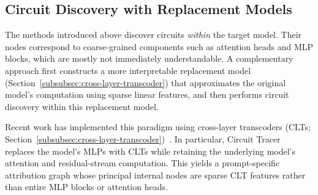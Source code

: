 \subsection{Circuit Discovery with Replacement Models}
\label{sec:circuit-replacement}

The methods introduced above discover circuits \emph{within} the target model. Their nodes correspond to coarse-grained components such as attention heads and MLP blocks, which are mostly not immediately understandable. A complementary approach first constructs a more interpretable replacement model (Section~\ref{subsubsec:cross-layer-transcoder}) that approximates the original model’s computation using sparse linear features, and then performs circuit discovery within this replacement model.

Recent work has implemented this paradigm using cross-layer transcoders (CLTs; Section~\ref{subsubsec:cross-layer-transcoder})~. In particular, Circuit Tracer~ replaces the model’s MLPs with CLTs while retaining the underlying model's attention and residual-stream computation. This yields a prompt-specific attribution graph whose principal internal nodes are sparse CLT features rather than entire MLP blocks or attention heads.

